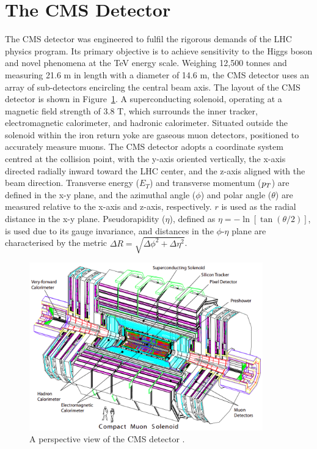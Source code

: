 \section{The CMS Detector}

The \ac{CMS} detector was engineered to fulfil the rigorous demands of the \ac{LHC} physics program. 
Its primary objective is to achieve sensitivity to the Higgs boson and novel phenomena at the TeV energy scale. 
Weighing 12,500 tonnes and measuring 21.6 m in length with a diameter of 14.6 m, the \ac{CMS} detector uses an array of sub-detectors encircling the central beam axis. 
The layout of the \ac{CMS} detector is shown in Figure~\ref{fig:CMS_Schematic}.
A superconducting solenoid, operating at a magnetic field strength of 3.8 T, which surrounds the inner tracker, electromagnetic calorimeter, and hadronic calorimeter. 
Situated outside the solenoid within the iron return yoke are gaseous muon detectors, positioned to accurately measure muons. 
The \ac{CMS} detector adopts a coordinate system centred at the collision point, with the y-axis oriented vertically, the x-axis directed radially inward toward the \ac{LHC} center, and the z-axis aligned with the beam direction. 
Transverse energy ($E_T$) and transverse momentum ($p_{T}$) are defined in the x-y plane, and the azimuthal angle ($\phi$) and polar angle ($\theta$) are measured relative to the x-axis and z-axis, respectively. 
$r$ is used as the radial distance in the x-y plane.
Pseudorapidity ($\eta$), defined as $\eta = -\ln[\tan(\theta/2)]$, is used due to its gauge invariance, and distances in the $\phi$-$\eta$ plane are characterised by the metric $\Delta R = \sqrt{\Delta\phi^2 + \Delta\eta^2}$. 

\begin{figure}[h]
    \centering
    \includegraphics[width=0.9\textwidth]{Figures/CMS_Detector.png}
    \caption{A perspective view of the \ac{CMS} detector \cite{CMS_Setup}.}
    \label{fig:CMS_Schematic}
\end{figure}

